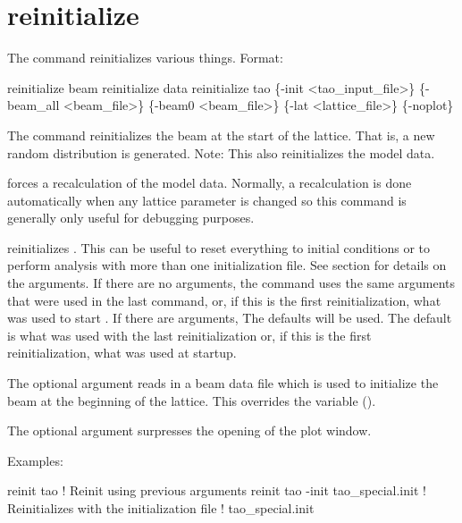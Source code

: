 \section{reinitialize}
\label{s:reinit}

The  command reinitializes various things. Format:
\begin{example}
  reinitialize beam
  reinitialize data
  reinitialize tao \{-init <tao_input_file>\} \{-beam_all <beam_file>\} 
           \{-beam0 <beam_file>\} \{-lat <lattice_file>\} \{-noplot\}
\end{example}

\vskip 0.2in 

The  command reinitializes the beam at the start
of the lattice. That is, a new random distribution is generated. 
Note: This also reinitializes the model data.

 forces a recalculation of the model data.
Normally, a recalculation is done automatically when any lattice
parameter is changed so this command is generally only useful for
debugging purposes.

 reinitializes \tao. This can be useful to reset
everything to initial conditions or to perform analysis with more than
one initialization file.  See section  for
details on the arguments.  If there are no arguments, the
 command uses the same arguments that were used in
the last  command, or, if this is the first
reinitialization, what was used to start \tao. If there are arguments,
The defaults will be used.  The default  is what was
used with the last reinitialization or, if this is the first
reinitialization, what was used at startup.

The  optional argument reads in a beam data file which is
used to initialize the beam at the beginning of the lattice. This
overrides the  variable ().

The  optional argument surpresses the opening of the plot window.

Examples:
\begin{example}
  reinit tao                         ! Reinit using previous arguments
  reinit tao -init tao_special.init  ! Reinitializes \tao with the initialization file 
                                     !   tao_special.init
\end{example}


